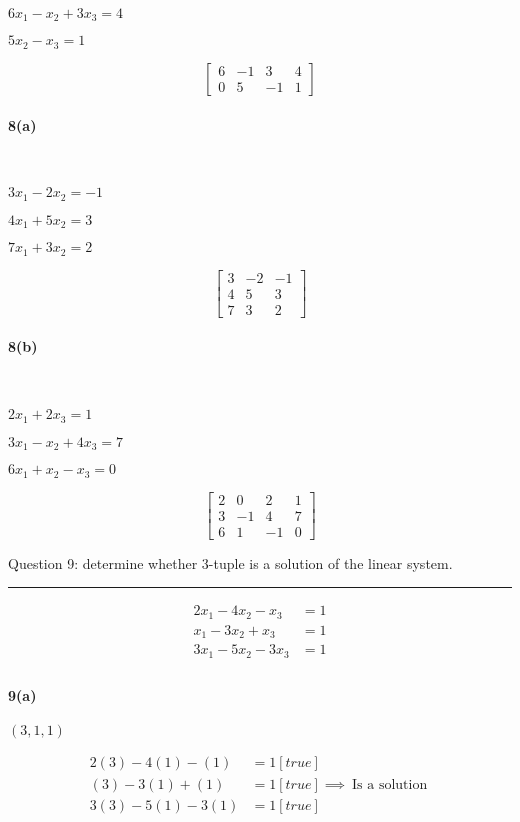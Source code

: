 \documentclass[a4paper,11pt,twoside]{report}
\begin{document}
$6x_1 - x_2 + 3x_3 = 4$

$5x_2 - x_3 = 1$

\[\begin{bmatrix} 6 & -1 & 3 & 4 \\ 0 & 5 & -1 & 1 \end{bmatrix} \]

\paragraph{8(a)} \

$3x_1 - 2x_2 = -1$

$4x_1 + 5x_2 = 3$

$7x_1 + 3x_2 = 2$

\[\begin{bmatrix} 3 & -2 & -1 \\ 4 & 5 & 3 \\ 7 & 3 & 2 \end{bmatrix} \]

\paragraph{8(b)} \

$2x_1 + 2x_3 = 1$

$3x_1 - x_2 + 4x_3 = 7$

$6x_1 + x_2 - x_3 = 0$

\[\begin{bmatrix} 2 & 0 & 2 & 1 \\ 3 & -1 & 4 & 7 \\ 6 & 1 & -1 & 0 \end{bmatrix} \]


\noindent Question 9: determine whether 3-tuple is a solution of the linear system. \\ \hrule

\begin{align*}
	2x_1 - 4x_2 - x_3 &= 1 \\
	x_1 - 3x_2 + x_3 &= 1 \\
	3x_1 - 5x_2 - 3x_3 &= 1 \\
\end{align*}

\paragraph{9(a)} $(3,1,1)$

\begin{align*}
	2(3) - 4(1) - (1) &= 1  [true]\\
	(3) - 3(1) + (1) &= 1 [true]  \implies \boxed{\:\text{Is a solution}\:}\\
	3(3) - 5(1) - 3(1) &= 1 [true] \\
\end{align*}
\end{document}
